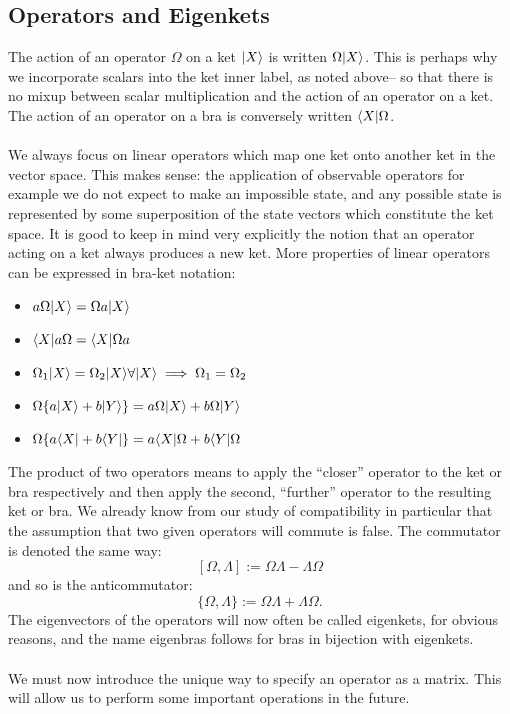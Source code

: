 \subsection{Operators and Eigenkets}
The action of an operator $\Omega$ on a ket $|X\rangle$ is written $\Omega|X\rangle$. This is perhaps why we incorporate scalars into the ket inner label, as noted above-- so that there is no mixup between scalar multiplication and the action of an operator on a ket. The action of an operator on a bra is conversely written $\langle X|\Omega$.
\\\\
We always focus on linear operators which map one ket onto another ket in the vector space. This makes sense: the application of observable operators for example we do not expect to make an impossible state, and any possible state is represented by some superposition of the state vectors which constitute the ket space. It is good to keep in mind  very explicitly the notion that an operator acting on a ket always produces a new ket. More properties of linear operators can be expressed in bra-ket notation:
\begin{itemize}
    \item $a\Omega|X\rangle=\Omega a|X\rangle$
    \item $\langle X|a\Omega=\langle X|\Omega a$
    \item $\Omega_{1}|X\rangle=\Omega_{2}|X\rangle \forall|X\rangle\implies\Omega_{1}=\Omega_{2}$
    \item $\Omega\{a|X\rangle+b|Y\rangle\}=a\Omega|X\rangle+b\Omega|Y\rangle$
    \item $\Omega\{a\langle X|+b\langle Y|\}=a\langle X|\Omega+b\langle Y|\Omega$
\end{itemize}
The product of two operators means to apply the ``closer'' operator to the ket or bra respectively and then apply the second, ``further'' operator to the resulting ket or bra. We already know from our study of compatibility in particular that the assumption that two given operators will commute is false. The commutator is denoted the same way:
$$
[\Omega, \Lambda]:=\Omega\Lambda-\Lambda\Omega
$$
and so is the anticommutator:
$$
\{\Omega, \Lambda\}:=\Omega\Lambda+\Lambda\Omega.
$$
The eigenvectors of the operators will now often be called eigenkets, for obvious reasons, and the name eigenbras follows for bras in bijection with eigenkets. 
\\\\
We must now introduce the unique way to specify an operator as a matrix. This will allow us to perform some important operations in the future. 
